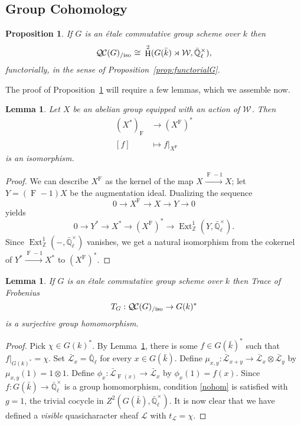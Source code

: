 \documentclass{amsart}
\theoremstyle{plain}
\newtheorem{proposition}[theorem]{Proposition}
\newtheorem{lemma}[theorem]{Lemma}
\theoremstyle{definition}
\theoremstyle{remark}
\newcommand{\ZZ}{{\mathbb{Z}}}
\newcommand{\EE}{\mathbb{\bar Q}_\ell}
\newcommand{\bFq}{\bar{k}}
\newcommand{\Fq}{k}
\newcommand{\EEx}{\EE^\times}
\newcommand{\Weil}[1]{\mathcal{W}_{#1}}
\newcommand{\Frob}[1]{\operatorname{F}_{#1}}
\DeclareMathOperator{\Ext}{Ext}
\DeclareMathOperator{\Hh}{H}
\newcommand{\iso}{{\ \cong\ }}
\newcommand{\qcs}[1]{{\mathcal{#1}}}
\newcommand{\gqcs}[1]{{\mathcal{\bar #1}}}
\newcommand{\QC}{{\mathcal{Q\hskip-0.8pt C}}}
\newcommand{\QCiso}[1]{\QC(#1)_{/\text{iso}}}
\newcommand{\trFrob}[1]{t_{#1}}
\newcommand{\TrFrob}[1]{T_{#1}}
\begin{document}
\subsection{Group Cohomology}


\begin{proposition} \label{prop:etale-iso}
	If $G$ is an \'etale commutative group scheme over $\Fq$
  	then
  	\[
  	\QCiso{G} \iso \Hh^2(G(\bFq)\rtimes \Weil{}, \EEx),
  	\]
  	functorially,
  	in the sense of Proposition~\ref{prop:functorialG}.
\end{proposition}

The proof of Proposition~\ref{prop:etale-iso} will require a few lemmas,
which we assemble now.
%

\begin{lemma} \label{lem:dual-inv}
Let $X$ be an abelian group equipped with an action of $\Weil{}$.
 Then
\begin{align*}
 (X^*)_{\Frob{}} &\to (X^{\Frob{}})^* \\
 [f] &\mapsto f|_{X^{\Frob{}}}
\end{align*}
is an isomorphism.
\end{lemma}

\begin{proof}
We can describe $X^{\Frob{}}$ as the kernel of the map $X \xrightarrow{\Frob{}-1} X$;
let $Y = (\Frob{}-1)X$ be the augmentation ideal.  Dualizing the sequence
\[
 0 \to X^{\Frob{}} \to X \to Y \to 0
\]
yields
\[
 0 \to Y^* \to X^* \to (X^{\Frob{}})^* \to \Ext^1_\ZZ(Y, \EEx).
\]
Since $\Ext^1_\ZZ(-,\EEx)$ vanishes, we get a natural isomorphism from the cokernel of $Y^* \xrightarrow{\Frob{}-1} X^*$ to $(X^{\Frob{}})^*$.
\end{proof}


\begin{lemma}\label{lem:etale-trace}
If $G$ is an \'etale commutative group scheme over $\Fq$
then Trace of Frobenius
\[
\TrFrob{G} : \QCiso{G} \to G(\Fq)^*
\]
is a surjective group homomorphism.
\end{lemma}

\begin{proof}
Pick $\chi \in G(\Fq)^*$.
By Lemma~\ref{lem:dual-inv}, there is some $f\in G(\bFq)^*$ such that $f\vert_{G(\Fq)^*} = \chi$.
Set $\gqcs{L}_x = \EE$ for every $x\in G(\bFq)$.
Define $\mu_{x,y} : \gqcs{L}_{x+y} \to \gqcs{L}_x\otimes \gqcs{L}_y$ by $\mu_{x,y}(1) = 1 \otimes 1$.
Define $\phi_{x} : \gqcs{L}_{\Frob{}(x)} \to \gqcs{L}_x$ by $\phi_{x}(1) = f(x)$.
Since $f : G(\bFq) \to \EEx$ is a group homomorphism,
condition \eqref{nohom} is satisfied with $g =1$, the trivial cocycle in $Z^2(G(\bFq),\EEx)$.
It is now clear that we have defined a \emph{visible} quasicharacter sheaf $\qcs{L}$ with $\trFrob{\qcs{L}} = \chi$.
\end{proof}
\end{document}
